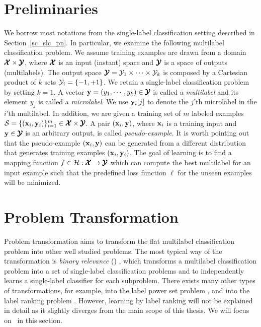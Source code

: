 {%
\section{Preliminaries} \label{sc_mlc_pn}

We borrow most notations from the single-label classification setting described in Section~\ref{sc_slc_pn}.
In particular, we examine the following {multilabel classification} problem.
We assume training examples are drawn from a domain $\pmb {\mathcal{X}}\times\pmb {\mathcal{Y}}$, where $\pmb {\mathcal{X}}$ is an input (instant) space and $\pmb {\mathcal{Y}}$ is a space of outputs (multilabels).
The output space $\pmb {\mathcal{Y}} = \mathcal{Y}_1\times\cdots\times\mathcal{Y}_k$ is composed by a Cartesian product of $k$ sets $\mathcal{Y}_i=\{-1,+1\}$.
We retain a single-label classification problem by setting $k=1$.
A vector $\mathbf {y}=(y_1,\cdots,y_k)\in\pmb {\mathcal{Y}}$ is called a \textit{multilabel} and its element $y_j$ is called a \textit{microlabel}.
We use $\mathbf {y}_i[j]$ to denote the $j$'th microlabel in the $i$'th multilabel.
In addition, we are given a training set of $m$ labeled examples $\mathcal{S}=\{(\mathbf {x}_i,\mathbf {y}_i)\}_{i=1}^{m}\in\pmb {\mathcal{X}}\times\pmb {\mathcal{Y}}$. 
A pair $(\mathbf {x}_i,\mathbf {y})$, where $\mathbf {x}_i$ is a training input and $\mathbf {y}\in\pmb {\mathcal{Y}}$ is an arbitrary output, is called \textit{pseudo-example}.
It is worth pointing out that the pseudo-example $(\mathbf {x}_i,\mathbf {y})$ can be generated from a different distribution that generates training examples $(\mathbf {x}_i,\mathbf {y}_i)$.
The goal of learning is to find a mapping function $f\in\mathcal{H}:\pmb {\mathcal{X}}\rightarrow\pmb {\mathcal{Y}}$ which can compute the best multilabel for an input example such that the predefined loss function $\ell$ for the unseen examples will be minimized.



%
%
\section{Problem Transformation}

Problem transformation aims to transform the flat multilabel classification problem into other well studied problems.
The most typical way of the transformation is \textit{binary relevance} (\br) \citep{Tsoumakas07multi,Tsoumakas10mining}, which transforms a multilabel classification problem into a set of single-label classification problems and to independently learns a single-label classifier for each subproblem.
There exists many other types of transformations, for example, into the label power set problem \citep{Tsoumakas07random}, and into the label ranking problem \citep{Elisseeff01akernel,Brinker07case,Furnkranz08multilabel,Chiang12a}.
However, learning by label ranking will not be explained in detail as it slightly diverges from the main scope of this thesis.
We will focus on \br\ in this section.



}
